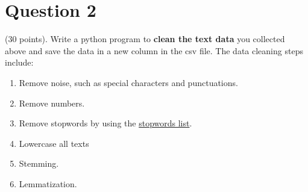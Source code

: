 \documentclass[11pt]{article}
\begin{document}
    \hypertarget{question-2}{%
\section{\texorpdfstring{\textbf{Question
2}}{Question 2}}\label{question-2}}

    (30 points). Write a python program to \textbf{clean the text data} you
collected above and save the data in a new column in the csv file. The
data cleaning steps include:

\begin{enumerate}
\def\labelenumi{(\arabic{enumi})}
\item
  Remove noise, such as special characters and punctuations.
\item
  Remove numbers.
\item
  Remove stopwords by using the
  \href{https://gist.github.com/sebleier/554280}{stopwords list}.
\item
  Lowercase all texts
\item
  Stemming.
\item
  Lemmatization.
\end{enumerate}
\end{document}
